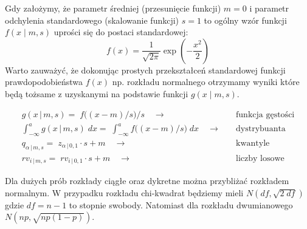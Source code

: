 \documentclass[polish,]{book}
\begin{document}
Gdy założymy, że parametr średniej (przesunięcie funkcji) \(m=0\) i parametr odchylenia standardowego (skalowanie funkcji) \(s=1\) to ogólny wzór funkcji \(f(x\;|\;m,s)\) uprości się do postaci standardowej:
\begin{equation}
f(x)=\frac{1}{\sqrt{2\pi}}\exp{\left(-\frac{x^2}{2}\right)}
\label{eq:n03}
\end{equation}
Warto zauważyć, że dokonując prostych przekształceń standardowej funkcji prawdopodobieństwa \(f(x)\) np. rozkładu normalnego otrzymamy wyniki które będą tożsame z uzyskanymi na podstawie funkcji \(g(x\;|\;m,s)\).

\begin{align}
g(x\,|\,m, s)=\;f\big((x-m)/s\big)/s \quad\longrightarrow\quad
&
\textrm{funkcja gęstości} \label{eq:G01}\\[2.5pt]
\int_{-\infty}^{a}g(x\,|\,m,s)\;dx=\;\int_{-\infty}^{a}f\big((x-m)/s\big)\;dx \quad\longrightarrow\quad
&
\textrm{dystrybuanta} \label{eq:I01}\\[2.5pt]
q_{\alpha\,|\,m,s}=\;z_{\alpha\,|\,0,1}\cdot s+m \quad\longrightarrow\quad
&
\textrm{kwantyle} \label{eq:Q01}\\[2.5pt]
rv_{i\,|\,m,s}=\;rv_{i\,|\,0,1}\cdot s+m \quad\longrightarrow\quad
&
\textrm{liczby losowe} \label{eq:RV01}
\end{align}

Dla dużych prób rozkłady ciągłe oraz dykretne można przybliżać rozkładem normalnym.
W przypadku rozkładu chi-kwadrat będziemy mieli \(N(df,\sqrt{2\;df})\) gdzie \(df=n-1\) to stopnie swobody. Natomiast dla rozkładu dwumianowego \(N(np,\sqrt{np(1-p)})\).
\end{document}
